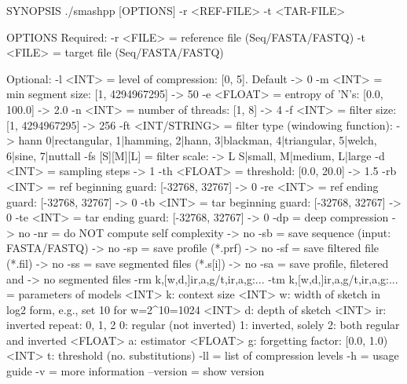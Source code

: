 \begin{code}[style=bash]
SYNOPSIS
  ./smashpp [OPTIONS]  -r <REF-FILE>  -t <TAR-FILE>

OPTIONS
  Required:
  -r  <FILE>         = reference file (Seq/FASTA/FASTQ)
  -t  <FILE>         = target file    (Seq/FASTA/FASTQ)

  Optional:
  -l  <INT>          = level of compression: [0, 5]. Default -> 0
  -m  <INT>          = min segment size: [1, 4294967295]     -> 50
  -e  <FLOAT>        = entropy of 'N's: [0.0, 100.0]         -> 2.0
  -n  <INT>          = number of threads: [1, 8]             -> 4
  -f  <INT>          = filter size: [1, 4294967295]          -> 256
  -ft <INT/STRING>   = filter type (windowing function):     -> hann
                       {0|rectangular, 1|hamming, 2|hann,
                       3|blackman, 4|triangular, 5|welch,
                       6|sine, 7|nuttall}
  -fs [S][M][L]      = filter scale:                         -> L
                       {S|small, M|medium, L|large}
  -d  <INT>          = sampling steps                        -> 1
  -th <FLOAT>        = threshold: [0.0, 20.0]                -> 1.5
  -rb <INT>          = ref beginning guard: [-32768, 32767]  -> 0
  -re <INT>          = ref ending guard: [-32768, 32767]     -> 0
  -tb <INT>          = tar beginning guard: [-32768, 32767]  -> 0
  -te <INT>          = tar ending guard: [-32768, 32767]     -> 0
  -dp                = deep compression                      -> no
  -nr                = do NOT compute self complexity        -> no
  -sb                = save sequence (input: FASTA/FASTQ)    -> no
  -sp                = save profile (*.prf)                  -> no
  -sf                = save filtered file (*.fil)            -> no
  -ss                = save segmented files (*.s[i])         -> no
  -sa                = save profile, filetered and           -> no
                       segmented files
  -rm k,[w,d,]ir,a,g/t,ir,a,g:...
  -tm k,[w,d,]ir,a,g/t,ir,a,g:...
                     = parameters of models
                <INT>  k:  context size
                <INT>  w:  width of sketch in log2 form,
                           e.g., set 10 for w=2^10=1024
                <INT>  d:  depth of sketch
                <INT>  ir: inverted repeat: {0, 1, 2}
                           0: regular (not inverted)
                           1: inverted, solely
                           2: both regular and inverted
              <FLOAT>  a:  estimator
              <FLOAT>  g:  forgetting factor: [0.0, 1.0)
                <INT>  t:  threshold (no. substitutions)
  -ll                = list of compression levels
  -h                 = usage guide
  -v                 = more information
  --version          = show version
\end{code}

